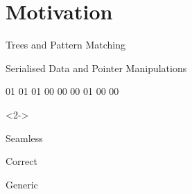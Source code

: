 
\section{Motivation}

\begin{frame}{Trees and Pattern Matching}
\begin{minipage}{.5\textwidth}

\end{minipage}\hfill
\begin{minipage}{.45\textwidth}
\end{minipage}
\end{frame}

\begin{frame}[fragile]{Serialised Data and Pointer Manipulations}
\begin{hexdump}
01 01 01 00  00  00  01 00  00
\end{hexdump}
\begin{overlayarea}{\linewidth}{6cm}
\begin{onlyenv}<2->

\end{onlyenv}
\end{overlayarea}
\end{frame}

\begin{frame}{Seamless}

  \vspace*{2em}

  \begin{minipage}{.6\textwidth}
  \end{minipage}\hfill

  \hfill\begin{minipage}{.6\textwidth}
  \end{minipage}
\end{frame}


\begin{frame}{Correct}
  \vfill
\end{frame}


\begin{frame}{Generic}




\end{frame}
